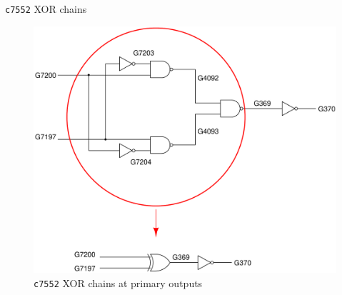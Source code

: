 \begin{frame}{\texttt{c7552} XOR chains}
       \begin{figure}
                \begin{center}
                \label{fig:c7552-c-l}
                \caption{\texttt{c7552} XOR chains at primary outputs}
                        \includegraphics[scale=0.2]{fig/c7552-xor-chains.pdf}
                \end{center}
        \end{figure}

\end{frame}

